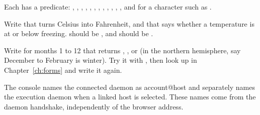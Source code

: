Each has a predicate: , , ,
, , , ,
, , , ,
, and  for a character such as
.

\begin{puzzle}[ 1: temperatures]
Write  that turns Celsius into Fahrenheit, and
 that says whether a temperature is at or below freezing.
 should be , and  should be
.
\end{puzzle}

\begin{puzzle}[ 2: seasons]
Write  for months 1 to 12 that returns
, ,  or  (in
the northern hemisphere, say December to February is winter). Try it with
, then look up  in Chapter~\ref{ch:forms} and write it
again.
\end{puzzle}

The console names the connected daemon as account@host and separately names
the execution daemon when a linked host is selected. These names come from
the daemon handshake, independently of the browser address.
